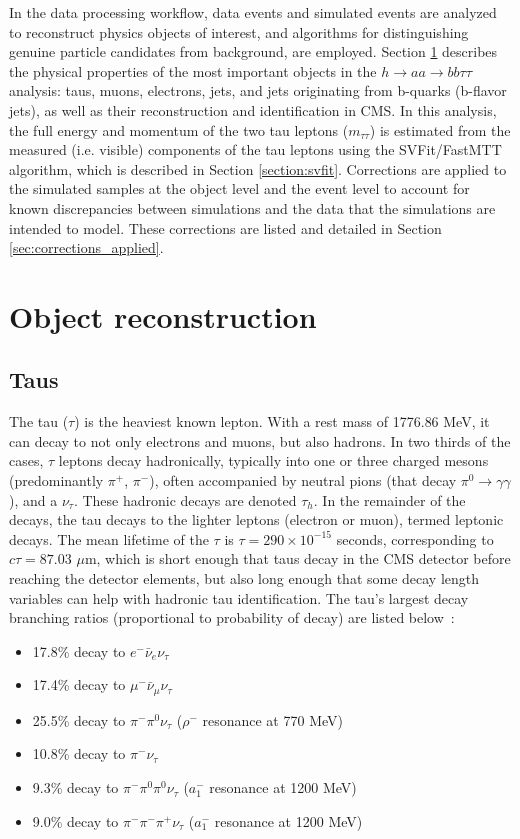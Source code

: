 In the data processing workflow, data events and simulated events are analyzed to reconstruct physics objects of interest, and algorithms for distinguishing genuine particle candidates from background, are employed. Section \ref{sec:object-reconstruction} describes the physical properties of the most important objects in the $h \rightarrow aa \rightarrow bb\tau\tau$ analysis: taus, muons, electrons, jets, and jets originating from b-quarks (b-flavor jets), as well as their reconstruction and identification in CMS. In this analysis, the full energy and momentum of the two tau leptons ($m_{\tau\tau}$) is estimated from the measured (i.e. visible) components of the tau leptons using the SVFit/FastMTT algorithm, which is described in Section \ref{section:svfit}. Corrections are applied to the simulated samples at the object level and the event level to account for known discrepancies between simulations and the data that the simulations are intended to model. These corrections are listed and detailed in Section \ref{sec:corrections_applied}.

\section{Object reconstruction}
\label{sec:object-reconstruction}
\subsection{Taus}
\label{section:taus}
The tau ($\tau$) is the heaviest known lepton. With a rest mass of 1776.86 MeV, it can decay to not only electrons and muons, but also hadrons. In two thirds of the cases, $\tau$ leptons decay hadronically, typically into one or three charged mesons (predominantly $\pi^+$, $\pi^-$), often accompanied by neutral pions (that decay $\pi^0 \rightarrow \gamma\gamma$), and a $\nu_{\tau}$. These hadronic decays are denoted $\tau_{h}$. In the remainder of the decays, the tau decays to the lighter leptons (electron or muon), termed leptonic decays. The mean lifetime of the $\tau$ is $\tau = 290 \times 10^{-15}$ seconds, corresponding to $c\tau = 87.03$ $\mu$m, which is short enough that taus decay in the CMS detector before reaching the detector elements, but also long enough that some decay length variables can help with hadronic tau identification. The tau's largest decay branching ratios (proportional to probability of decay) are listed below~\citep{workman_review_2022}: 
\begin{itemize}
    \item 17.8\% decay to $e^- \bar{\nu}_e \nu_{\tau}$
    \item 17.4\% decay to $\mu^- \bar{\nu}_\mu \nu_{\tau}$
    \item 25.5\% decay to $\pi^- \pi^0 \nu_{\tau}$ ($\rho^-$ resonance at 770 MeV)
    \item 10.8\% decay to $\pi^- \nu_{\tau}$ %
    \item 9.3\% decay to $\pi^- \pi^0 \pi^0 \nu_{\tau}$  ($a_1^-$ resonance at 1200 MeV)
    \item 9.0\% decay to $\pi^- \pi^- \pi^+ \nu_{\tau}$ ($a_1^-$ resonance at 1200 MeV)
\end{itemize}

